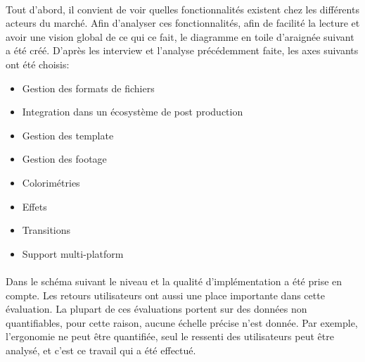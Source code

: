   \paragraph{}
  Tout d'abord, il convient de voir quelles fonctionnalités existent chez les différents
  acteurs du marché. Afin d'analyser ces fonctionnalités, afin de facilité la lecture et
  avoir une vision global de ce qui ce fait, le diagramme en toile d'araignée suivant a été créé.
  D'après les interview et l'analyse précédemment faite, les axes suivants ont été choisis:
  \begin {itemize}
    \item{Gestion des formats de fichiers}
    \item{Integration dans un écosystème de post production}
    \item{Gestion des template}
    \item{Gestion des footage}
    \item{Colorimétries}
    \item{Effets}
    \item{Transitions}
    \item{Support multi-platform}
  \end {itemize}

  \paragraph{}
  Dans le schéma suivant le niveau et la qualité d'implémentation a été prise en compte. Les
  retours utilisateurs ont aussi une place importante dans cette évaluation. La plupart de ces
  évaluations portent sur des données non quantifiables, pour cette raison, aucune échelle précise n'est donnée.
  Par exemple, l'ergonomie ne peut être quantifiée, seul le ressenti des utilisateurs peut être analysé,
  et c'est ce travail qui a été effectué.

